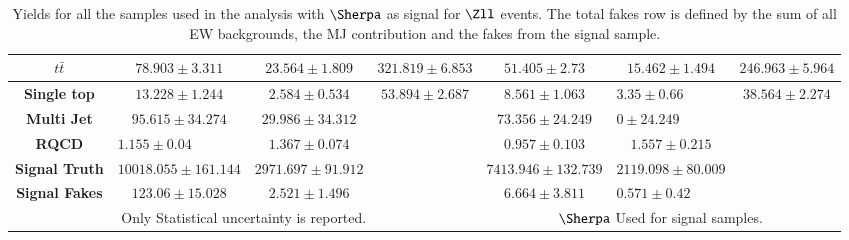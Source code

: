 \begin{table}[]
{\begin{tabular}{|c|c|c|c|c|c|c|}
			\rowcolor[HTML]{FFFFFF} 
			\textbf{$t\bar{t}$}                  & $78.903\pm3.311$                                            & $23.564\pm1.809$                  & $321.819\pm6.853$                                    & $51.405\pm2.73$                   & $15.462\pm1.494$                                            & $246.963\pm5.964$                   \\ \hline
			\rowcolor[HTML]{FFFFFF} 
			\textbf{Single top}                  & $13.228\pm1.244$                                            & $2.584\pm0.534$                   & $53.894\pm2.687$                                     & $8.561\pm1.063$                   & \multicolumn{1}{l|}{\cellcolor[HTML]{FFFFFF}$3.35\pm0.66$}  & $38.564\pm2.274$                    \\ \hline
			\rowcolor[HTML]{FFFFFF} 
			\textbf{Multi Jet}                   & $95.615\pm34.274$                                           & $29.986\pm34.312$                 &                                                      & $73.356\pm24.249$                 & \multicolumn{1}{l|}{\cellcolor[HTML]{FFFFFF}$0\pm24.249$}   &                                     \\ \hline
			\rowcolor[HTML]{FFFFFF} 
			\textbf{RQCD}                        & \multicolumn{1}{l|}{\cellcolor[HTML]{FFFFFF}$1.155\pm0.04$} & $1.367\pm0.074$                   &                                                      & $0.957\pm0.103$                   & $1.557\pm0.215$                                             &                                     \\ \hline
			\rowcolor[HTML]{FFFFFF} 
			\textbf{Signal Truth}                & $10018.055\pm161.144$                                       & $2971.697\pm91.912$               &                                                      & $7413.946\pm132.739$              & $2119.098\pm80.009$                                         &                                     \\ \hline
			\rowcolor[HTML]{FFFFFF} 
			\textbf{Signal Fakes}                & $123.06\pm15.028$                                           & $2.521\pm1.496$                   &                                                      & $6.664\pm3.811$                   & \multicolumn{1}{l|}{\cellcolor[HTML]{FFFFFF}$0.571\pm0.42$} &                                     \\ \hline
			\multicolumn{4}{|c|}{Only Statistical uncertainty is reported.}                                                                                                                                                & \multicolumn{3}{c|}{$\Sherpa$ Used for signal samples.}                                                                               \\ \hline
		\end{tabular}%
	\caption{Yields for all the samples used in the analysis with $\Sherpa$ as signal for $\Zll$ events. The total fakes row is defined by the sum of all EW backgrounds, the MJ contribution and the fakes from the signal sample.}
	\label{Tab6}
	}
\end{table}

